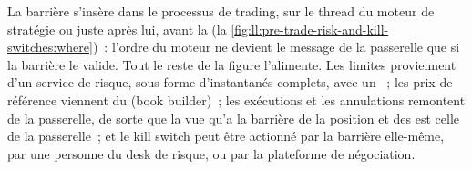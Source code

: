 La barrière s'insère dans le processus de trading, sur le thread du moteur de stratégie ou juste après lui, avant la 
(la \cref{fig:ll:pre-trade-risk-and-kill-switches:where})~: l'ordre du moteur ne devient le message de la passerelle que si la barrière
le valide. Tout le reste de la figure l'alimente. Les limites proviennent d'un service de risque, sous forme d'instantanés complets, avec un ~; les
prix de référence viennent du  (book builder)~; les exécutions et les annulations remontent de la passerelle, de sorte que la vue qu'a la barrière
de la position et des  est celle de la passerelle~; et le kill switch peut être actionné par la barrière elle-même, par une personne
du desk de risque, ou par la plateforme de négociation.

